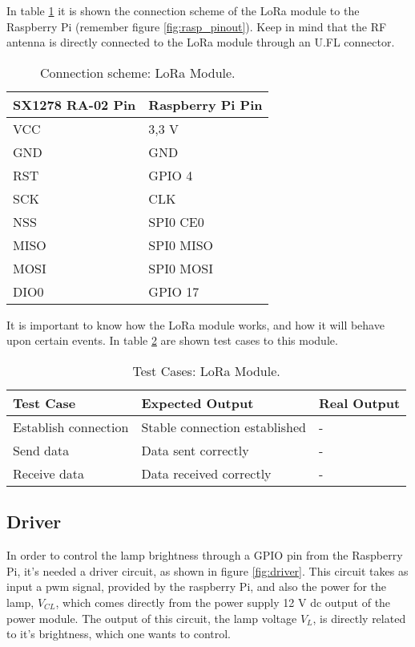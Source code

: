 In table \ref{table:connect_lora} it is shown the connection scheme of the LoRa module to the Raspberry Pi (remember figure \ref{fig:rasp_pinout}). Keep in mind that the RF antenna is directly connected to the LoRa module through an U.FL connector.

\begin{table}[H]
	\centering
	\begin{tabular}{|m{5cm}|m{6cm}|}
		\hline
		\textbf{SX1278 RA-02 Pin} & \textbf{Raspberry Pi Pin}
		\\\hline\hline
		
		VCC & 3,3 V
		\\\hline
		GND & GND
		\\\hline
		RST & GPIO 4
		\\\hline
		SCK & CLK
		\\\hline
		NSS & SPI0 CE0
		\\\hline
		MISO & SPI0 MISO
		\\\hline
		MOSI & SPI0 MOSI
		\\\hline
		DIO0 & GPIO 17
		\\\hline
	\end{tabular}
	
	\caption{Connection scheme: LoRa Module.}
	\label{table:connect_lora}
\end{table}

It is important to know how the LoRa module works, and how it will behave upon certain events. In table \ref{table:test_lora} are shown test cases to this module.

\begin{table}[H]
	\centering
	\resizebox{\columnwidth}{!}
	{
		\begin{tabular}{|m{3cm}|m{5cm}||m{5cm}|}
			\hline
			\textbf{Test Case} & \textbf{Expected Output} & \textbf{Real Output}
			\\\hline\hline
			Establish connection & Stable connection established & -
			\\\hline
			Send data & Data sent correctly & -
			\\\hline
			Receive data & Data received correctly & -
			\\\hline
		\end{tabular}
	}
	\caption{Test Cases: LoRa Module.}
	\label{table:test_lora}
\end{table}


\subsection{Driver}
\label{subsection:driver}
In order to control the lamp brightness through a GPIO pin from the Raspberry Pi, it's needed a driver circuit, as shown in figure \ref{fig:driver}. This circuit takes as input a \ac{pwm} signal, provided by the raspberry Pi, and also the power for the lamp, \(V_{CL}\), which comes directly from the power supply 12 V \ac{dc} output of the power module. The output of this circuit, the lamp voltage \(V_{L}\), is directly related to it's brightness, which one wants to control.

